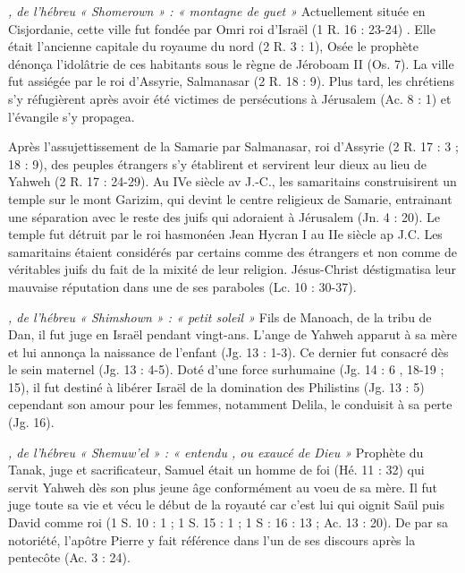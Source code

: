 \begin{multicols}{2}
\textit{, de l'hébreu « Shomerown » : « montagne de guet »}\newline
Actuellement située en Cisjordanie, cette ville fut fondée par Omri roi d'Israël (1 R. 16 : 23-24) . Elle était l'ancienne capitale du royaume du nord (2 R. 3 : 1), Osée le prophète dénonça l'idolâtrie de ces habitants sous le règne de Jéroboam II (Os. 7). La ville fut assiégée par le roi d'Assyrie, Salmanasar (2 R. 18 : 9). Plus tard, les chrétiens s'y réfugièrent après avoir été victimes de persécutions à Jérusalem (Ac. 8 : 1) et l'évangile s'y propagea.

\textit{}\newline
Après l'assujettissement de la Samarie par Salmanasar, roi d'Assyrie (2 R. 17 : 3 ; 18 : 9), des peuples étrangers s'y établirent et servirent leur dieux au lieu de Yahweh (2 R. 17 : 24-29). Au IVe siècle av J.-C., les samaritains construisirent un temple sur le mont Garizim, qui devint le centre religieux de Samarie, entrainant une séparation avec le reste des juifs qui adoraient à Jérusalem (Jn. 4 : 20). Le temple fut détruit par le roi hasmonéen Jean Hycran I au IIe siècle ap J.C. Les samaritains étaient considérés par certains comme des étrangers et non comme de véritables juifs du fait de la mixité de leur religion. Jésus-Christ déstigmatisa leur mauvaise réputation dans une de ses paraboles (Lc. 10 : 30-37).

\textit{, de l'hébreu « Shimshown » : « petit soleil »}\newline
Fils de Manoach, de la tribu de Dan, il fut juge en Israël pendant vingt-ans. L'ange de Yahweh apparut à sa mère et lui annonça la naissance de l'enfant (Jg. 13 : 1-3). Ce dernier fut consacré dès le sein maternel (Jg. 13 : 4-5). Doté d'une force surhumaine (Jg. 14 : 6 , 18-19 ; 15), il fut destiné à libérer Israël de la domination des Philistins (Jg. 13 : 5) cependant son amour pour les femmes, notamment Delila, le conduisit à sa perte (Jg. 16).

\textit{, de l'hébreu « Shemuw'el » : « entendu , ou exaucé de Dieu »}\newline
Prophète du Tanak, juge et sacrificateur, Samuel était un homme de foi (Hé. 11 : 32) qui servit Yahweh dès son plus jeune âge conformément au voeu de sa mère. Il fut juge toute sa vie et vécu le début de la royauté car c'est lui qui oignit Saül puis David comme roi (1 S. 10 : 1 ; 1 S. 15 : 1 ; 1 S : 16 : 13 ; Ac. 13 : 20). De par sa notoriété, l'apôtre Pierre y fait référence dans l'un de ses discours après la pentecôte (Ac. 3 : 24).


\end{multicols}
